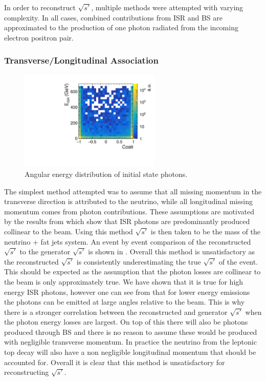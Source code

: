 In order to reconstruct $\sqrt{s'}$, multiple methods were attempted with varying complexity. In all cases, combined contributions from \ac{ISR} and \ac{BS} are approximated to the production of one photon radiated from the incoming electron positron pair.

\subsubsection{Transverse/Longitudinal Association}

\begin{figure}
  \centering
  \includegraphics[width=0.6\textwidth]{TopAnalysis/figures/ISRSpectrum.pdf}
  \caption[Angular energy distribution of initial state photons]{Angular energy distribution of initial state photons.}
  \label{fig:photonspectrum}
\end{figure}


The simplest method attempted was to assume that all missing momentum in the transverse direction is attributed to the neutrino, while all longitudinal missing momentum comes from photon contributions. These assumptions are motivated by the results from  which show that \ac{ISR} photons are predominantly produced collinear to the beam. Using this method $\sqrt{s'}$ is then taken to be the mass of the neutrino + fat jets system. An event by event comparison of the reconstructed $\sqrt{s'}$ to the generator $\sqrt{s'}$ is shown in . Overall this method is unsatisfactory as the reconstructed $\sqrt{s'}$ is consistently underestimating the true $\sqrt{s'}$ of the event. This should be expected as the assumption that the photon losses are collinear to the beam is only approximately true. We have shown that it is true for high energy \ac{ISR} photons, however one can see from  that for lower energy emissions the photons can be emitted at large angles relative to the beam. This is why there is a stronger correlation between the reconstructed and generator $\sqrt{s'}$ when the photon energy losses are largest. On top of this there will also be photons produced through \ac{BS} and there is no reason to assume these would be produced with negligible transverse momentum. In practice the neutrino from the leptonic top decay will also have a non negligible longitudinal momentum that should be accounted for. Overall it is clear that this method is unsatisfactory for reconstructing $\sqrt{s'}$.

